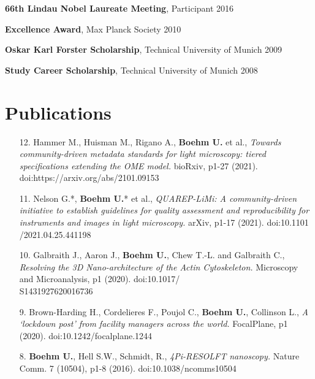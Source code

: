 \documentclass[margin,line]{res}
\begin{document}
\begin{resume}
\vspace*{-3mm}
{\bf 66th Lindau Nobel Laureate Meeting}, Participant \hfill {2016}

\vspace*{-3mm}
{\bf Excellence Award}, Max Planck Society \hfill 2010

\vspace*{-3mm}
{\bf Oskar Karl Forster Scholarship}, Technical University of Munich  \hfill 2009

\vspace*{-3mm}
{\bf Study Career Scholarship}, Technical University of Munich  \hfill 2008


\section{\sc Publications}

\begin{enumerate}[leftmargin=*]

\item[12.] Hammer M., Huisman M., Rigano A., {\bf Boehm U.} et al., {\it Towards community-driven metadata standards for light microscopy: tiered specifications extending the OME model.} bioRxiv, p1-27 (2021). doi:https://arxiv.org/abs/2101.09153

\item[11.] Nelson G.*, {\bf Boehm U.}* et al., {\it QUAREP-LiMi: A community-driven initiative to establish guidelines for quality assessment and reproducibility for instruments and images in light microscopy.} arXiv, p1-17 (2021). doi:10.1101\\/2021.04.25.441198

\item[10.] Galbraith J., Aaron J., {\bf Boehm U.}, Chew T.-L. and Galbraith C., {\it Resolving the 3D Nano-architecture of the Actin Cytoskeleton.} Microscopy and Microanalysis, p1 (2020). doi:10.1017/\\S1431927620016736

\item[9.] Brown-Harding H., Cordelieres F., Poujol C., {\bf Boehm U.}, Collinson L., {\it A ‘lockdown post’ from facility managers across the world.} FocalPlane, p1 (2020). doi:10.1242/focalplane.1244

\item[8.]  {\bf Boehm U.}, Hell S.W., Schmidt, R., {\it 4Pi-RESOLFT nanoscopy.} Nature Comm. 7 (10504), p1-8 (2016). doi:10.1038/ncomms10504


\end{enumerate}
\end{resume}
\end{document}
